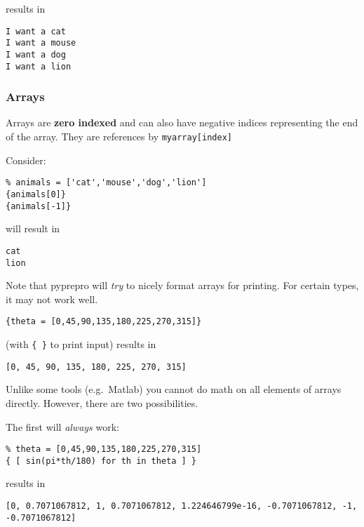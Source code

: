 results in

\begin{verbatim}
I want a cat
I want a mouse
I want a dog
I want a lion
\end{verbatim}

\subsubsection{Arrays}\label{arrays}

Arrays are \textbf{zero indexed} and can also have negative indices
representing the end of the array. They are references by
\texttt{myarray{[}index{]}}

Consider:

\begin{verbatim}
% animals = ['cat','mouse','dog','lion']
{animals[0]}
{animals[-1]}
\end{verbatim}

will result in

\begin{verbatim}
cat
lion
\end{verbatim}

Note that pyprepro will \emph{try} to nicely format arrays for printing.
For certain types, it may not work well.

\begin{verbatim}
{theta = [0,45,90,135,180,225,270,315]}
\end{verbatim}

(with \texttt{\{\ \}} to print input) results in

\begin{verbatim}
[0, 45, 90, 135, 180, 225, 270, 315]
\end{verbatim}

\label{math-on-arrays}

Unlike some tools (e.g.~Matlab) you cannot do math on all elements of
arrays directly. However, there are two possibilities.

The first will \emph{always} work:

\begin{verbatim}
% theta = [0,45,90,135,180,225,270,315] 
{ [ sin(pi*th/180) for th in theta ] }
\end{verbatim}

results in

\begin{verbatim}
[0, 0.7071067812, 1, 0.7071067812, 1.224646799e-16, -0.7071067812, -1, -0.7071067812]
\end{verbatim}

